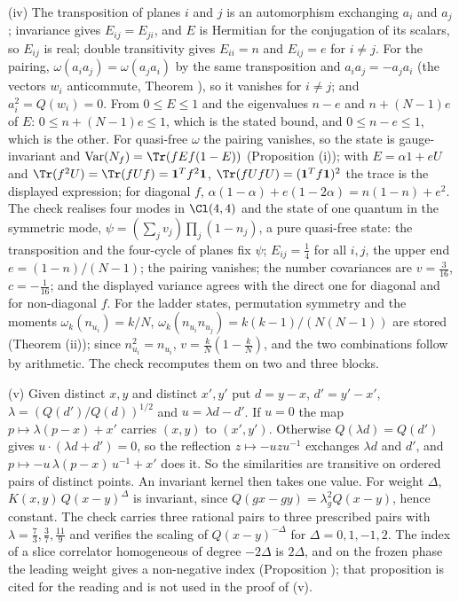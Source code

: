 (iv) The transposition of planes $i$ and $j$ is an automorphism exchanging $a_{i}$ and $a_{j}$; invariance gives $E_{ij} = E_{ji}$, and $E$ is Hermitian for the conjugation of its scalars, so $E_{ij}$ is real; double transitivity gives $E_{ii} = n$ and $E_{ij} = e$ for $i \ne j$. For the pairing, $\omega(a_{i}a_{j}) = \omega(a_{j}a_{i})$ by the same transposition and $a_{i}a_{j} = -a_{j}a_{i}$ (the vectors $w_{i}$ anticommute, Theorem ), so it vanishes for $i \ne j$; and $a_{i}^{2} = Q(w_{i}) = 0$. From $0 \le E \le 1$ and the eigenvalues $n - e$ and $n + (N - 1)e$ of $E$: $0 \le n + (N - 1)e \le 1$, which is the stated bound, and $0 \le n - e \le 1$, which is the other. For quasi-free $\omega$ the pairing vanishes, so the state is gauge-invariant and $\mathrm{Var}(N_{f}) = \Tr(fEf(1 - E))$ (Proposition (i)); with $E = \alpha 1 + eU$ and $\Tr(f^{2}U) = \Tr(fUf) = \mathbf{1}^{T}f^{2}\mathbf{1}$, $\Tr(fUfU) = (\mathbf{1}^{T}f\mathbf{1})^{2}$ the trace is the displayed expression; for diagonal $f$, $\alpha(1 - \alpha) + e(1 - 2\alpha) = n(1 - n) + e^{2}$. The check realises four modes in $\Cl(4,4)$ and the state of one quantum in the symmetric mode, $\psi = (\sum_{j}v_{j})\prod_{j}(1 - n_{j})$, a pure quasi-free state: the transposition and the four-cycle of planes fix $\psi$; $E_{ij} = \tfrac14$ for all $i, j$, the upper end $e = (1 - n)/(N - 1)$; the pairing vanishes; the number covariances are $v = \tfrac{3}{16}$, $c = -\tfrac{1}{16}$; and the displayed variance agrees with the direct one for diagonal and for non-diagonal $f$. For the ladder states, permutation symmetry and the moments $\omega_{k}(n_{u_{i}}) = k/N$, $\omega_{k}(n_{u_{i}}n_{u_{j}}) = k(k - 1)/(N(N - 1))$ are stored (Theorem (ii)); since $n_{u_{i}}^{2} = n_{u_{i}}$, $v = \tfrac kN(1 - \tfrac kN)$, and the two combinations follow by arithmetic. The check recomputes them on two and three blocks.

(v) Given distinct $x, y$ and distinct $x', y'$ put $d = y - x$, $d' = y' - x'$, $\lambda = (Q(d')/Q(d))^{1/2}$ and $u = \lambda d - d'$. If $u = 0$ the map $p \mapsto \lambda(p - x) + x'$ carries $(x, y)$ to $(x', y')$. Otherwise $Q(\lambda d) = Q(d')$ gives $u \cdot (\lambda d + d') = 0$, so the reflection $z \mapsto -uzu^{-1}$ exchanges $\lambda d$ and $d'$, and $p \mapsto -u\,\lambda(p - x)\,u^{-1} + x'$ does it. So the similarities are transitive on ordered pairs of distinct points. An invariant kernel then takes one value. For weight $\Delta$, $K(x, y)\,Q(x - y)^{\Delta}$ is invariant, since $Q(gx - gy) = \lambda_{g}^{2}Q(x - y)$, hence constant. The check carries three rational pairs to three prescribed pairs with $\lambda = \tfrac73, \tfrac37, \tfrac{11}{9}$ and verifies the scaling of $Q(x - y)^{-\Delta}$ for $\Delta = 0, 1, -1, 2$. The index of a slice correlator homogeneous of degree $-2\Delta$ is $2\Delta$, and on the frozen phase the leading weight gives a non-negative index (Proposition ); that proposition is cited for the reading and is not used in the proof of (v).

